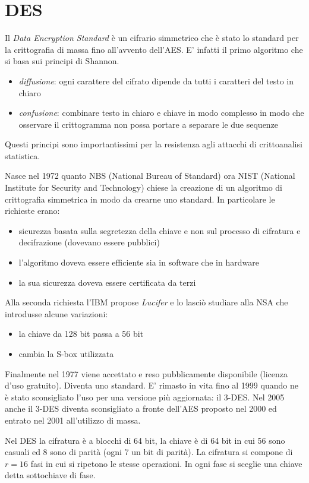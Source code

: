 \section{DES}
Il \emph{Data Encryption Standard} è un cifrario simmetrico che è stato lo standard per la crittografia di massa fino all'avvento dell'AES.
E' infatti il primo algoritmo che si basa sui principi di Shannon.
\begin{itemize}
    \item \emph{diffusione}: ogni carattere del cifrato dipende da tutti i caratteri del testo in chiaro
    \item \emph{confusione}: combinare testo in chiaro e chiave in modo complesso in modo che osservare il crittogramma non possa portare a separare le due sequenze
\end{itemize}
Questi principi sono importantissimi per la resistenza agli attacchi di crittoanalisi statistica.

Nasce nel 1972 quanto NBS (National Bureau of Standard) ora NIST (National Institute for Security and Technology) chiese la creazione di un algoritmo di crittografia simmetrica in modo da crearne uno standard. In particolare le richieste erano:
\begin{itemize}
    \item sicurezza basata sulla segretezza della chiave e non sul processo di cifratura e decifrazione (dovevano essere pubblici)
    \item l'algoritmo doveva essere efficiente sia in software che in hardware
    \item la sua sicurezza doveva essere certificata da terzi
\end{itemize}
Alla seconda richiesta l'IBM propose \emph{Lucifer} e lo lasciò studiare alla NSA che introdusse alcune variazioni:
\begin{itemize}
    \item la chiave da 128 bit passa a 56 bit
    \item cambia la S-box utilizzata
\end{itemize}

Finalmente nel 1977 viene accettato e reso pubblicamente disponibile (licenza d'uso gratuito). Diventa uno standard.
E' rimasto in vita fino al 1999 quando ne è stato sconsigliato l'uso per una versione più aggiornata: il 3-DES.
Nel 2005 anche il 3-DES diventa sconsigliato a fronte dell'AES proposto nel 2000 ed entrato nel 2001 all'utilizzo di massa.

Nel DES la cifratura è a blocchi di 64 bit, la chiave è di 64 bit in cui 56 sono casuali ed 8 sono di parità (ogni 7 un bit di parità).
La cifratura si compone di $r=16$ fasi in cui si ripetono le stesse operazioni. In ogni fase si sceglie una chiave detta sottochiave di fase.

